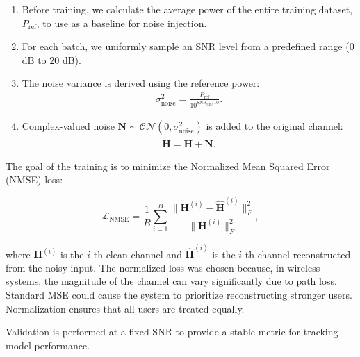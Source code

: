 \begin{enumerate}
    \item Before training, we calculate the average power of the entire training dataset, $P_{\text{ref}}$, to use as a baseline for noise injection.
    \item For each batch, we uniformly sample an SNR level from a predefined range ($0$ dB to $20$ dB).
    \item The noise variance is derived using the reference power:
    \begin{subequations}
        \begin{align}
            \sigma^2_{\text{noise}} = \frac{P_{\text{ref}}}{10^{\text{SNR}_{\text{dB}}/10}}.
        \end{align}
    \end{subequations}
    \item Complex-valued noise $\mathbf{N} \sim \mathcal{CN} (0, \sigma^2_{\text{noise}})$ is added to the original channel:
    \begin{subequations}
        \begin{align}
           \tilde{\mathbf{H}} = \mathbf{H} + \mathbf{N}.
        \end{align}
    \end{subequations}
\end{enumerate}

The goal of the training is to minimize the Normalized Mean Squared Error (NMSE) loss:

\begin{equation}
    \mathcal{L}_{\text{NMSE}} = \frac{1}{B} \sum_{i=1}^{B} \frac{ \| \mathbf{H}^{(i)} - \hat{\mathbf{H}}^{(i)} \|_F^2 }{ \| \mathbf{H}^{(i)} \|_F^2 },
\end{equation}

where $\mathbf{H}^{(i)}$ is the $i$-th clean channel and $\hat{\mathbf{H}}^{(i)}$ is the $i$-th channel reconstructed from the noisy input.
The normalized loss was chosen because, in wireless systems, the magnitude of the channel can vary significantly due to path loss.
Standard MSE could cause the system to prioritize reconstructing stronger users.
Normalization ensures that all users are treated equally.

Validation is performed at a fixed SNR to provide a stable metric for tracking model performance.